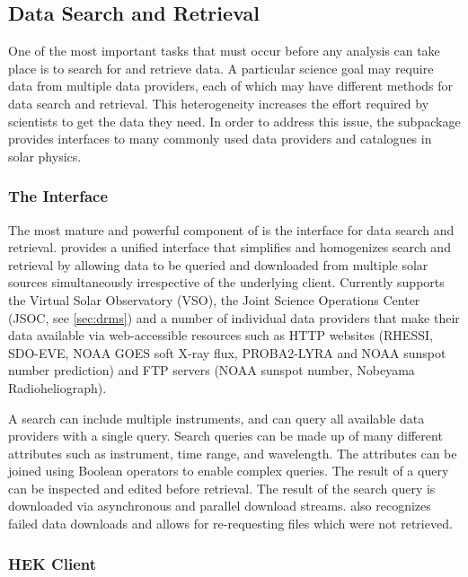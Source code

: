 
\subsection{Data Search and Retrieval}
\label{sec:fido}

One of the most important tasks that must occur before any analysis can take place is to search for and retrieve data.
A particular science goal may require data from multiple data providers, each of which may have different methods for data search and retrieval.
This heterogeneity increases the effort required by scientists to get the data they need.
In order to address this issue, the  subpackage provides interfaces to many commonly used data providers and catalogues in solar physics.

\subsubsection{The \Fido Interface}
\label{sec:fido}

The most mature and powerful component of  is the \Fido interface for data search and retrieval.
\Fido provides a unified interface that simplifies and homogenizes search and retrieval by allowing data to be queried and downloaded from multiple solar sources simultaneously irrespective of the underlying client.
Currently \Fido supports the Virtual Solar Observatory (VSO), the Joint Science Operations Center (JSOC, see \autoref{sec:drms}) and a number of individual data providers that make their data available via web-accessible resources such as HTTP websites (RHESSI, SDO-EVE, NOAA GOES soft X-ray flux, PROBA2-LYRA and NOAA sunspot number prediction) and FTP servers (NOAA sunspot number, Nobeyama Radioheliograph).

A \Fido search can include multiple instruments, and can query all available data providers with a single query.
Search queries can be made up of many different attributes such as instrument, time range, and wavelength.
The attributes can be joined using Boolean operators to enable complex queries.
The result of a query can be inspected and edited before retrieval.
The result of the \Fido search query is downloaded via asynchronous and parallel download streams.
\Fido also recognizes failed data downloads and allows for re-requesting files which were not retrieved.

\subsubsection{HEK Client}
\label{sec:hek}

